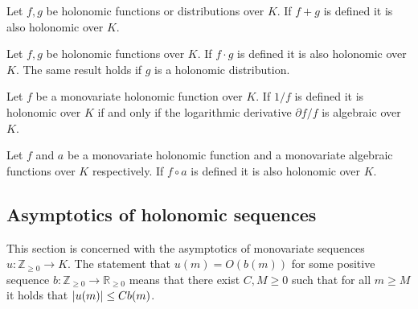     \begin{theorem}{\cite[Proposition 3.1]{zeilberger1990holonomic}}
      Let $f,g$ be holonomic functions or distributions over $K$.
      If $f+g$ is defined it is also holonomic over $K$.
    \end{theorem}
    \begin{theorem}{\cite[Proposition 3.2]{zeilberger1990holonomic}}
      Let $f,g$ be holonomic functions over $K$.
      If $f\cdot g$ is defined it is also holonomic over $K$.
      The same result holds if $g$ is a holonomic distribution.
    \end{theorem}
    \begin{theorem}{\cite[Corollary 1]{harris1985reciprocals}}
      Let $f$ be a monovariate holonomic function over $K$.
      If $1/f$ is defined it is holonomic over $K$ if and only if the logarithmic derivative $\partial f/f$ is algebraic over $K$.
    \end{theorem}
    \begin{theorem}{\cite[Theorem 2.7]{stanley1980differentiably}}\label{thm: AlgebraicPrecomp}
      Let $f$ and $a$ be a monovariate holonomic function and a monovariate algebraic functions over $K$ respectively.
      If $f\circ a$ is defined it is also holonomic over $K$.
    \end{theorem}
    \subsection{Asymptotics of holonomic sequences}
    This section is concerned with the asymptotics of monovariate sequences $u:\mathbb{Z}_{\geq 0}\to K$.
    The statement that $u(m) = O(b(m))$ for some positive sequence $b:\mathbb{Z}_{\geq 0}\to \mathbb{R}_{\geq 0}$ means that there exist $C,M\geq 0$ such that for all $m\geq M$ it holds that $\vert u(m) \vert\leq Cb(m)$.

